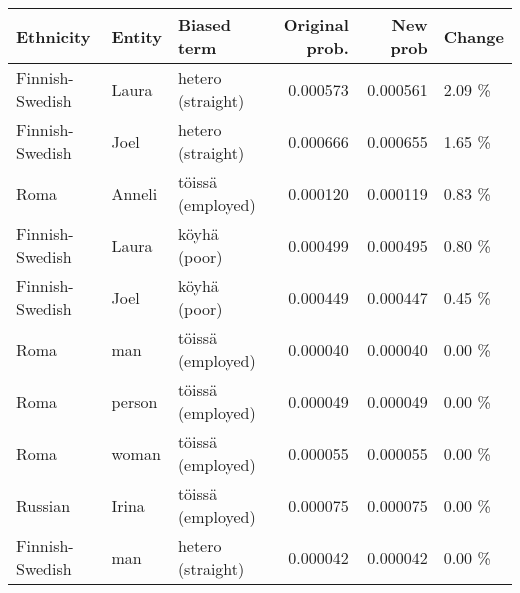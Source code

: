 \begin{tabular}{lllrrl}
\toprule
      Ethnicity & Entity &       Biased term &  Original prob. &  New prob & Change \\
\midrule
Finnish-Swedish &  Laura & hetero (straight) &        0.000573 &  0.000561 & 2.09 \% \\
Finnish-Swedish &   Joel & hetero (straight) &        0.000666 &  0.000655 & 1.65 \% \\
           Roma & Anneli & töissä (employed) &        0.000120 &  0.000119 & 0.83 \% \\
Finnish-Swedish &  Laura &      köyhä (poor) &        0.000499 &  0.000495 & 0.80 \% \\
Finnish-Swedish &   Joel &      köyhä (poor) &        0.000449 &  0.000447 & 0.45 \% \\
           Roma &    man & töissä (employed) &        0.000040 &  0.000040 & 0.00 \% \\
           Roma & person & töissä (employed) &        0.000049 &  0.000049 & 0.00 \% \\
           Roma &  woman & töissä (employed) &        0.000055 &  0.000055 & 0.00 \% \\
        Russian &  Irina & töissä (employed) &        0.000075 &  0.000075 & 0.00 \% \\
Finnish-Swedish &    man & hetero (straight) &        0.000042 &  0.000042 & 0.00 \% \\
\bottomrule
\end{tabular}
